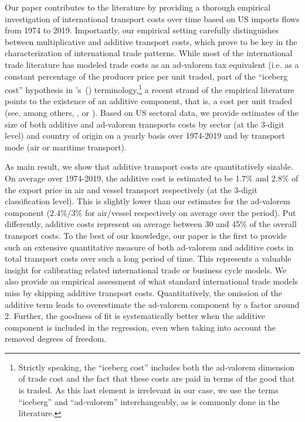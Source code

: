 \documentclass[a4paper,11pt]{article}
\newcommand\cites[1]{\citeauthor{#1}'s\ (\citeyear{#1})}
\begin{document}
Our paper contributes to the literature by providing a thorough empirical investigation of international transport costs over time based on US imports flows from 1974 to 2019. Importantly, our empirical setting carefully distinguishes between multiplicative and additive transport costs, which prove to be key in the characterization of international trade patterns. While most of the international trade literature has modeled trade costs as an ad-valorem tax equivalent (i.e. as a constant percentage of the producer price per unit traded, part of the ``iceberg cost'' hypothesis in \cites{samuelson1954} terminology,\footnote{Strictly speaking, the ``iceberg cost'' includes both the ad-valorem dimension of trade cost and the fact that these costs are paid in terms of the good that is traded. As this last element is irrelevant in our case, we use the terms ``iceberg'' and ``ad-valorem'' interchangeably, as is commonly done in the literature.} a recent strand of the empirical literature points to the existence of an additive component, that is, a cost per unit traded (see, among others, \cite{Irrazabal_2015}, or \cite{martin2012}). Based on US sectoral data, we provide estimates of the size of both additive and ad-valorem transports costs by sector (at the 3-digit level) and country of origin on a yearly basis over 1974-2019 and by transport mode (air or maritime transport).\smallskip


As main result, we show that additive transport costs are quantitatively sizable. On average over 1974-2019, the additive cost is estimated to be 1.7\% and 2.8\% of the export price in air and vessel transport respectively (at the 3-digit classification level). This is slightly lower than our estimates for the ad-valorem component (2.4\%/3\% for air/vessel respectively on average over the period).
Put differently, additive costs represent on average between 30 and 45\% of the overall transport costs. To the best of our knowledge, our paper is the first to provide such an extensive quantitative measure of both ad-valorem and additive costs in total transport costs over such a long period of time. This represents a valuable insight for calibrating related international trade or business cycle models.
We also provide an empirical assessment of what standard international trade models miss by skipping additive transport costs.
Quantitatively, the omission of the additive term leads to overestimate the ad-valorem component by a factor around 2. Further, the goodness of fit is systematically better when the additive component is included in the regression, even when taking into account the removed degrees of freedom.\smallskip
\end{document}
